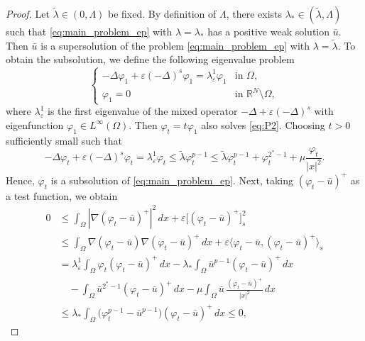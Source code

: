 \documentclass[11pt]{article}
\newcommand{\om} {\Omega}
\newcommand{\la} {\lambda}
\newcommand{\La} {\Lambda}
\begin{document}
\begin{proof}
Let \(\tilde\lambda \in (0, \La)\) be fixed. By definition of $\La$, there exists \(\lambda_{*} \in (\tilde\lambda, \Lambda)\) such that \eqref{eq:main_problem_ep} with $\la = \la_*$ has a positive weak solution \(\bar u\).  
Then \(\bar  u\) is a supersolution of the problem \eqref{eq:main_problem_ep} with $\la = \tilde \la$. To obtain the subsolution, we define the following eigenvalue problem
\begin{equation}
\begin{cases}
-\Delta \varphi_1 + \varepsilon(-\Delta)^{s} \varphi_1 = \lambda_{\varepsilon}^1 \varphi_1 & \text{in } \Omega, \\[6pt]
\varphi_1 = 0 & \text{in } \mathbb{R}^N \setminus \Omega,
\end{cases}
\label{eq:P2}
\tag{P2}
\end{equation}
where \(\lambda_{\varepsilon}^1\) is the first eigenvalue of the mixed operator \(-\Delta + \varepsilon(-\Delta)^s\) with eigenfunction $\varphi_1 \in L^{\infty}(\om)$. Then \(\varphi_t = t \varphi_1\) also solves \eqref{eq:P2}.  
Choosing \(t > 0\) sufficiently small such that
\begin{equation*}
-\Delta \varphi_t + \varepsilon (-\Delta)^s \varphi_t = \lambda_{\varepsilon}^1 \varphi_t 
\leq \tilde\lambda \varphi_t^{p-1} \leq \tilde\lambda \varphi_t^{p-1} + \varphi_t^{2^*-1} + \mu \frac{\varphi_t}{|x|^2}.
\end{equation*}
Hence, \(\varphi_t\) is a subsolution of \eqref{eq:main_problem_ep}. 
Next, taking \((\varphi_t - \bar u)^+\) as a test function, we obtain
\begin{equation*}
\begin{aligned}
0 &\leq \int_{\Omega} |\nabla (\varphi_t - \bar u)^+|^2 \, dx 
+  \varepsilon \big[ (\varphi_t - \bar u)^+ \big]^2_{s} \\
&\leq \int_{\Omega} \nabla (\varphi_t - \bar u)  \nabla (\varphi_t - \bar u)^+ \, dx 
+ \varepsilon \langle \varphi_t - \bar u, (\varphi_t - \bar u)^+ \rangle_{s} \\[6pt]
&= \lambda_{\varepsilon}^1 \int_{\Omega} \varphi_t (\varphi_t - \bar u)^+ \, dx
- \lambda_* \int_{\Omega} \bar u^{p-1} (\varphi_t - \bar u)^+ \, dx \\[6pt]
&\quad - \int_{\Omega} \bar u^{2^*-1} (\varphi_t - \bar u)^+ \, dx
- \mu \int_{\Omega} \bar u \, \frac{(\varphi_t - \bar u)^+}{|x|^2} \, dx\\
&\leq \lambda_* \int_{\Omega} \Big( \varphi_t^{p-1} - \bar u^{p-1} \Big) (\varphi_t - \bar u)^+ \, dx \leq 0,

\end{aligned}
\end{equation*}
\end{proof}
\end{document}
